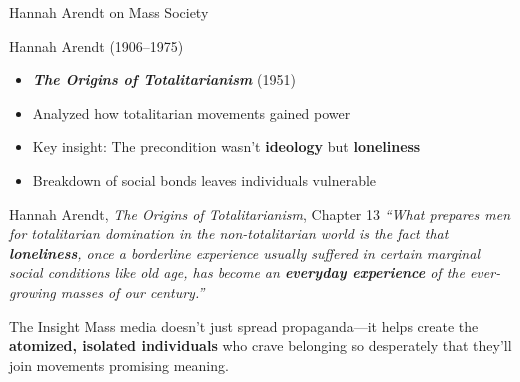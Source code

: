 \documentclass[aspectratio=169]{beamer}
\begin{document}
\begin{frame}{Hannah Arendt on Mass Society}
\begin{block}{Hannah Arendt (1906--1975)}
\begin{itemize}
  \item \textbf{\textit{The Origins of Totalitarianism}} (1951)
  \item Analyzed how totalitarian movements gained power
  \item Key insight: The precondition wasn't \textbf{ideology} but \textbf{loneliness}
  \item Breakdown of social bonds leaves individuals vulnerable
\end{itemize}
\end{block}

\vspace{0.3em}
\begin{exampleblock}{\faQuoteLeft\hspace{0.5em}Hannah Arendt, \textit{The Origins of Totalitarianism}, Chapter 13 \parencite{arendt_origins}}
\small
\textit{``What prepares men for totalitarian domination in the non-totalitarian world is the fact that \textbf{loneliness}, once a borderline experience usually suffered in certain marginal social conditions like old age, has become an \textbf{everyday experience} of the ever-growing masses of our century.''}
\end{exampleblock}

\vspace{0.2em}
\begin{alertblock}{\faLightbulb\hspace{0.5em}The Insight}
Mass media doesn't just spread propaganda---it helps create the \textbf{atomized, isolated individuals} who crave belonging so desperately that they'll join movements promising meaning.
\end{alertblock}
\end{frame}
\end{document}
